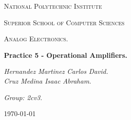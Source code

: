 \begin{titlepage}
	\centering
	{ \huge \scshape National Polytechnic Institute\par}
	{ \Large \scshape  Superior School of Computer Sciences\par }
	\vspace{1cm}
	{\scshape\Large Analog Electronics.\par}
	\vspace{1.5cm}
	{\Huge\bfseries Practice 5 - Operational Amplifiers.\par}
	\vspace{2cm}
	{\Large\itshape Hernandez Martinez Carlos David. \\ Cruz Medina Isaac Abraham. \par} \hfill \break
	{\Large\itshape Group: 2cv3. \par}
	\vfill
	{\large \today\par} 
	\vfill
\end{titlepage}


\tableofcontents 
{}
\pagebreak
